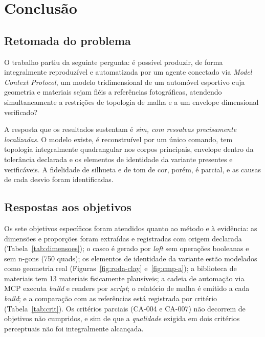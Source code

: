 \section{Conclus\~ao}
\label{sec:conclusao}

\subsection{Retomada do problema}

O trabalho partiu da seguinte pergunta: \'e poss\'ivel produzir, de forma integralmente
reproduz\'ivel e automatizada por um agente conectado via \emph{Model Context Protocol}, um
modelo tridimensional de um autom\'ovel esportivo cuja geometria e materiais sejam fi\'eis a
refer\^encias fotogr\'aficas, atendendo simultaneamente a restri\c{c}\~oes de topologia de
malha e a um envelope dimensional verificado?

A resposta que os resultados sustentam \'e \emph{sim, com ressalvas precisamente
localizadas}. O modelo existe, \'e reconstru\'ivel por um \'unico comando, tem topologia
integralmente quadrangular nos corpos principais, envelope dentro da toler\^ancia declarada
e os elementos de identidade da variante presentes e verific\'aveis. A fidelidade de
silhueta e de tom de cor, por\'em, \'e parcial, e as causas de cada desvio foram
identificadas.

\subsection{Respostas aos objetivos}

Os sete objetivos espec\'ificos foram atendidos quanto ao m\'etodo e \`a evid\^encia: as
dimens\~oes e propor\c{c}\~oes foram extra\'idas e registradas com origem declarada
(Tabela~\ref{tab:dimensoes}); o casco \'e gerado por \emph{loft} sem opera\c{c}\~oes
booleanas e sem n-gons (750 quads); os elementos de identidade da variante est\~ao
modelados como geometria real (Figuras~\ref{fig:roda-clay} e~\ref{fig:cmp-a}); a
biblioteca de materiais tem 13 materiais fisicamente plaus\'iveis; a cadeia de
automa\c{c}\~ao via MCP executa \emph{build} e renders por \emph{script}; o relat\'orio de
malha \'e emitido a cada \emph{build}; e a compara\c{c}\~ao com as refer\^encias est\'a
registrada por crit\'erio (Tabela~\ref{tab:crit}). Os crit\'erios parciais (CA-004 e
CA-007) n\~ao decorrem de objetivos n\~ao cumpridos, e sim de que a \emph{qualidade}
exigida em dois crit\'erios perceptuais n\~ao foi integralmente alcan\c{c}ada.

